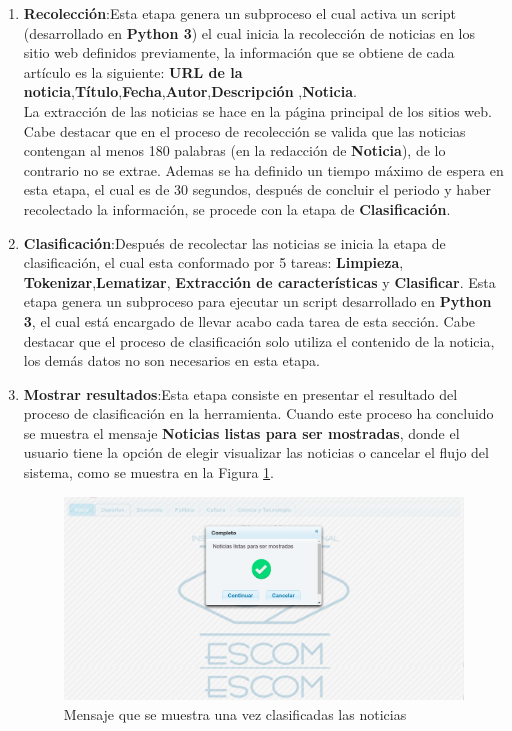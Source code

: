 \begin{enumerate}
  \item \textbf{Recolección}:Esta etapa genera un subproceso el cual activa un script (desarrollado en \textbf{Python 3}) el cual inicia la recolección de noticias en los sitio web definidos previamente, la información que se obtiene de cada artículo es la siguiente: \textbf{URL de la noticia},\textbf{Título},\textbf{Fecha},\textbf{Autor},\textbf{Descripción} ,\textbf{Noticia}.\\

  La extracción de las noticias se hace en la página principal de los sitios web. Cabe destacar que en el proceso de recolección se valida que las noticias contengan al menos 180 palabras (en la redacción de \textbf{Noticia}), de lo contrario no se extrae. Ademas se ha definido un tiempo máximo de espera en esta etapa, el cual es de 30 segundos, después de concluir el periodo y haber recolectado la información, se procede con la etapa de \textbf{Clasificación}.

  \item \textbf{Clasificación}:Después de recolectar las noticias se inicia la etapa de clasificación, el cual esta conformado por 5 tareas: \textbf{Limpieza}, \textbf{Tokenizar},\textbf{Lematizar}, \textbf{Extracción de características} y \textbf{Clasificar}. Esta etapa genera un subproceso para ejecutar un script desarrollado en \textbf{Python 3}, el cual está encargado de llevar acabo cada tarea de esta sección. Cabe destacar que el proceso de clasificación solo utiliza el contenido de la noticia, los demás datos no son necesarios en esta etapa.

  \item \textbf{Mostrar resultados}:Esta etapa consiste en presentar el resultado del proceso de clasificación en la herramienta. Cuando este proceso ha concluido se muestra el mensaje \textbf{Noticias listas para ser mostradas}, donde el usuario tiene la opción de elegir visualizar las noticias o cancelar el flujo del sistema, como se muestra en la Figura \ref{fig:notClass}. 

	\begin{figure}[h]
		\centering
		\includegraphics[scale=0.18]{imagenes/Aplicacion/noticiasListasParaSerMostradas.png}
		\caption{Mensaje que se muestra una vez clasificadas las noticias}
		\label{fig:notClass}
	\end{figure}


\end{enumerate}
